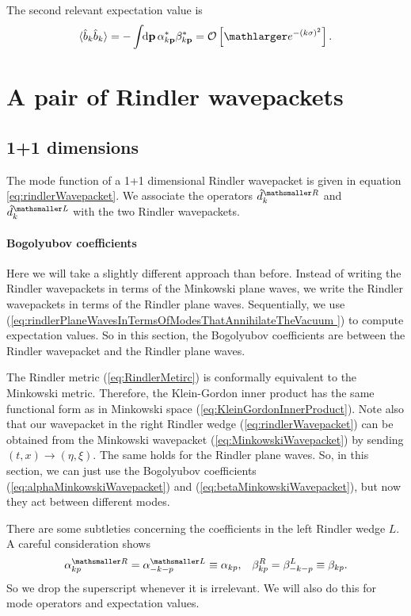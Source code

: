 \documentclass[11pt, a4paper]{article}
\def\bp{{\bf p}}
\newcommand{\be}{\beta}
\newcommand{\al}{\alpha}
\newcommand{\si}{{\sigma}}
\newcommand{\integral}{\int\!\! \mathrm{d}}
\newcommand{\ms}{\mathsmaller}
\begin{document}
The second relevant expectation value is 
\begin{align*}
	\langle \hat b_k \hat b_k \rangle =-\integral \bp\,\al_{k\bp}^* \be_{k\bp}^*
	=\mathcal O \left[\mathlarger e^{-( k  \si )^2}\right].
\end{align*}


\section{A pair of Rindler wavepackets}
\label{sec:calcRindler}
\subsection{1+1 dimensions}
The mode function of a 1+1 dimensional Rindler wavepacket is given in equation \ref{eq:rindlerWavepacket}. We associate the operators $\hat d^{\ms R}_k$ and $\hat d^{\ms L}_k$ with the two Rindler wavepackets.  



\paragraph{Bogolyubov coefficients}
Here we will take a slightly different approach than before. Instead of writing the Rindler wavepackets in terms of the Minkowski plane waves, we write the Rindler wavepackets in terms of the Rindler plane waves. Sequentially, we use (\ref{eq:rindlerPlaneWavesInTermsOfModesThatAnnihilateTheVacuum }) to compute expectation values. So in this section, the Bogolyubov coefficients are between the Rindler wavepacket and the Rindler plane waves.  

The Rindler metric (\ref{eq:RindlerMetirc}) is conformally equivalent to the Minkowski metric. Therefore, the Klein-Gordon inner product has the same functional form as in Minkowski space (\ref{eq:KleinGordonInnerProduct}). Note also that our wavepacket in the right Rindler wedge (\ref{eq:rindlerWavepacket}) can be obtained from the Minkowski wavepacket (\ref{eq:MinkowskiWavepacket}) by sending $(t,x)\to(\eta,\xi)$. The same holds for the Rindler plane waves.  So, in this section, we can just use the Bogolyubov coefficients (\ref{eq:alphaMinkowskiWavepacket}) and (\ref{eq:betaMinkowskiWavepacket}), but now they act between different modes. 

There are some subtleties concerning the coefficients in the left Rindler wedge $L$. A careful consideration shows 
\begin{align*}
	\al^{\ms R}_{kp}=\al^{\ms L}_{-k-p}\equiv \al_{kp},&& \be^R_{kp}=\be^L_{-k-p}\equiv \be_{kp}.
\end{align*}
So we drop the superscript whenever it is irrelevant. We will also do this for mode operators and expectation values. 
\end{document}
